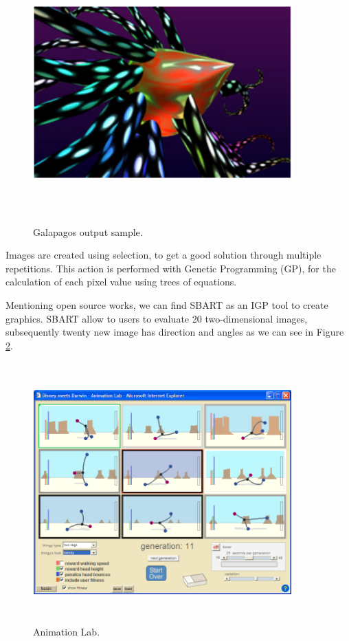 \begin{figure}
\captionsetup{justification=centering,margin=2cm}
\centering
\setlength\fboxsep{0pt}
\setlength\fboxrule{0.7pt}
\includegraphics[width=10cm,height=10cm,keepaspectratio]{img/Galapagos2.png}
\caption{Galapagos output sample.}
\label{fig:Galapagos2}
\end{figure}

Images are created using selection, to get a good solution through multiple
repetitions. This action is performed with Genetic Programming (GP), for the
calculation of each pixel value using trees of equations.

Mentioning open source works, we can find SBART as an IGP
\cite{unemi2000sbart} tool to create graphics. SBART allow to users
to evaluate 20 two-dimensional images, subsequently twenty new image has
direction and angles as we can see in Figure \ref{fig:AnimationLab}.

\begin{figure}
\captionsetup{justification=centering,margin=2cm}
\centering
\setlength\fboxsep{0pt}
\setlength\fboxrule{0.7pt}
\includegraphics[width=10cm,height=10cm,keepaspectratio]{img/AnimationLab.png}
\caption{Animation Lab.}
\label{fig:AnimationLab}
\end{figure}

